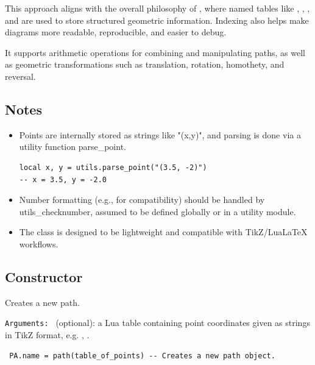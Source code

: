 This approach aligns with the overall philosophy of , where named tables like , , , and  are used to store structured geometric information. Indexing also helps make diagrams more readable, reproducible, and easier to debug.


It supports arithmetic operations for combining and manipulating paths, as well as geometric transformations such as translation, rotation, homothety, and reversal.

\subsection{Notes}

\begin{itemize}
\item Points are internally stored as strings like "(x,y)", and parsing is done via a utility function parse\_point.

\begin{verbatim}
local x, y = utils.parse_point("(3.5, -2)")
-- x = 3.5, y = -2.0
\end{verbatim}


\item Number formatting (e.g., for \TIKZ{} compatibility) should be handled by utils\_checknumber, assumed to be defined globally or in a utility module.

\item The class is designed to be lightweight and compatible with TikZ/LuaLaTeX workflows.

\end{itemize}





\subsection{Constructor }

Creates a new path.

\medskip

\texttt{Arguments: }
  (optional): a Lua table containing point
        coordinates given as strings in TikZ format,
        e.g. , .


\begin{center}
  \begin{verbatim}
 PA.name = path(table_of_points) -- Creates a new path object.
  \end{verbatim}
\end{center}

